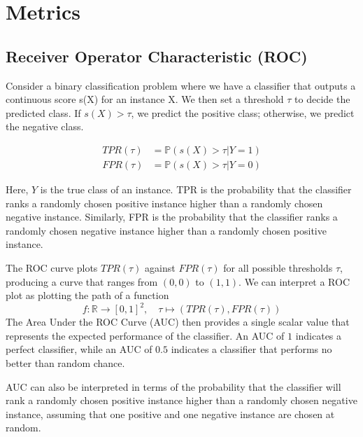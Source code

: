 
\section{Metrics}

\subsection{Receiver Operator Characteristic (ROC)}
	Consider a binary classification problem where we have a classifier that outputs a continuous score s(X) for an instance X.
	We then set a threshold $\tau$ to decide the predicted class. If $s(X) > \tau$, we predict the positive class; otherwise, we predict the negative class.
	
    	\begin{align*}
    		TPR(\tau) &= \mathbb{P}(s(X) > \tau | Y = 1) \\
    		FPR(\tau) &= \mathbb{P}(s(X) > \tau | Y = 0)
    	\end{align*}
	
	Here, $Y$ is the true class of an instance. 
	TPR is the probability that the classifier ranks a randomly chosen positive instance higher than a randomly chosen negative instance. 
	Similarly, FPR is the probability that the classifier ranks a randomly chosen negative instance higher than a randomly chosen positive instance.
    
    	
	The ROC curve plots $TPR(\tau)$ against $FPR(\tau)$ for all possible thresholds $\tau$, producing a curve that ranges from $(0,0)$ to $(1,1)$.
	We can interpret a ROC plot as plotting the path of a function
	\[
		f: \mathbb{R} \to [0,1]^2, \quad  \tau \mapsto (TPR(\tau), FPR(\tau))
	\]
	The Area Under the ROC Curve (AUC) then provides a single scalar value that represents the expected performance of the classifier.
	An AUC of $1$ indicates a perfect classifier, while an AUC of $0.5$ indicates a classifier that performs no better than random chance.
	
	AUC can also be interpreted in terms of the probability that the classifier will rank a randomly chosen positive instance higher than a randomly chosen negative instance,
	assuming that one positive and one negative instance are chosen at random.
	




